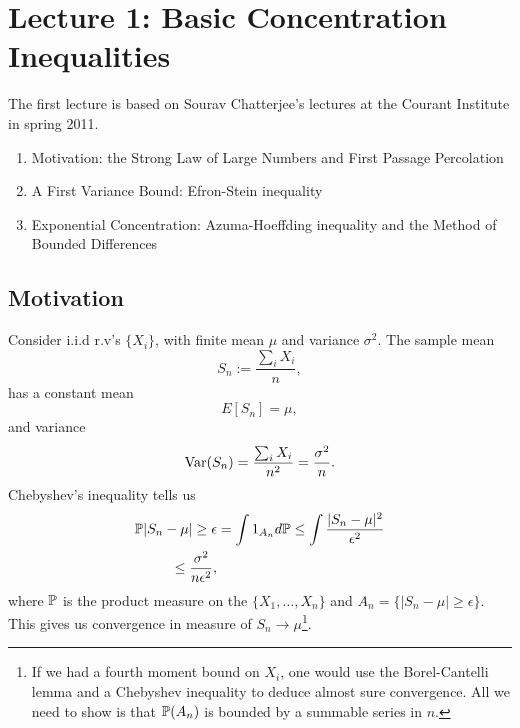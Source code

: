 \section{Lecture 1: Basic Concentration Inequalities}
\label{sec:lecture1}
The first lecture is based on Sourav Chatterjee's lectures at the Courant Institute in spring 2011. 
\begin{enumerate}
  \item Motivation: the Strong Law of Large Numbers and First Passage Percolation
  \item A First Variance Bound: Efron-Stein inequality
  \item Exponential Concentration: Azuma-Hoeffding inequality and the Method of Bounded Differences
\end{enumerate}
\subsection{Motivation}
\begin{example}
Consider i.i.d r.v's $\{X_i\}$, with finite mean $\mu$ and variance $\sigma^2$. The sample mean
\begin{equation}
  S_n := \frac{\sum_i X_i}{n},
  \label{eq:sample-mean-defintion}
\end{equation}
has a constant mean 
\[ E[S_n] = \mu, \]
and variance
\[ \textrm{Var}(S_n) = \frac{\sum_i X_i}{n^2} = \frac{\sigma^2}{n}. \]
Chebyshev's inequality tells us 
\begin{equation}
  \begin{split}
    \mathbb{P}{|S_n - \mu| \geq \epsilon} & = \int 1_{A_n} d\mathbb{P} \leq \int \frac{|S_n - \mu|^2}{\epsilon^2}  \\
    \leq \frac{\sigma^2}{n \epsilon^2},
  \end{split}
    \label{eq:chebyshev-inequality}
\end{equation}
where $\mathbb{P}$ is the product measure on the $\{ X_1,\ldots,X_n \}$ and $A_n = \{ |S_n - \mu| \geq \epsilon \}$. This gives us convergence in measure of $S_n \to \mu$\footnote{If we had a fourth moment bound on $X_i$, one would use the Borel-Cantelli lemma and a Chebyshev inequality to deduce almost sure convergence. All we need to show is that $\mathbb{P}(A_n)$ is bounded by a summable series in $n$.}.
\label{ex:law-of-large-numbers}
\end{example} 

